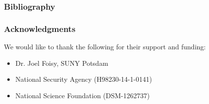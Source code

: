 
\begin{frame}
  \frametitle{Bibliography}
  
\end{frame}

\begin{frame}
  \frametitle{Acknowledgments}
  
  We would like to thank the following for their support and funding: 
  
 \begin{itemize}
 \item Dr. Joel Foisy, SUNY Potsdam
 \item National Security Agency (H98230-14-1-0141)
 \item National Science Foundation (DSM-1262737)
 \end{itemize}
\end{frame}



